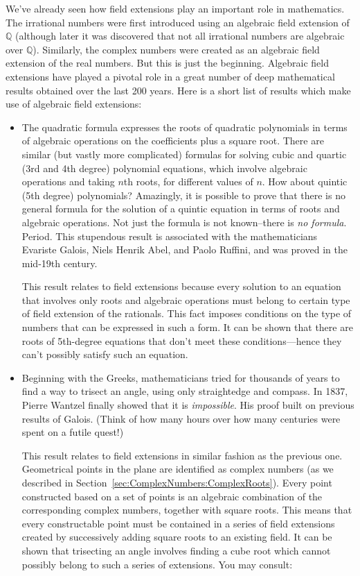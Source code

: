 We've already seen how field extensions play an important role in mathematics.  The irrational numbers were first introduced using an algebraic  field extension  of $\mathbb{Q}$  (although later it was discovered that not all irrational numbers are algebraic over $\mathbb{Q}$).  Similarly, the complex numbers were created as an algebraic field extension of the real numbers.  But this is just the beginning. Algebraic field extensions have played a pivotal role in a great number of deep mathematical results obtained over the last 200 years. Here is a short list of results which make use of algebraic field extensions:

\begin{itemize}
\item 
The quadratic formula expresses the roots of quadratic polynomials  in terms of algebraic operations on the coefficients plus a square root. There are similar (but vastly more complicated) formulas for solving cubic and quartic (3rd and 4th degree)  polynomial equations, which involve algebraic operations and  taking $n$th roots, for different values of $n$.  How about quintic (5th degree) polynomials?  Amazingly, it is possible to prove that there is no general formula for the solution of a quintic equation in terms of roots and algebraic operations.  Not just the formula is not known--there is \emph{no formula}. Period. This stupendous result is associated with the mathematicians Evariste Galois, Niels Henrik Abel, and Paolo Ruffini, and was proved in the mid-19th century.

This result relates to field extensions because every solution to an equation that involves only roots and algebraic operations must belong to certain type of field extension of the rationals. This fact imposes conditions on the type of numbers that can be expressed in such a form. It can be shown that there are roots of 5th-degree equations that don't meet these conditions---hence they can't possibly satisfy such an equation.

\item
Beginning with the Greeks,  mathematicians tried for thousands of years to find a way to trisect an angle, using only straightedge and compass. In 1837, Pierre Wantzel finally showed that it is \emph{impossible}. His proof built on previous results of Galois. (Think of how many hours over how many centuries were spent on a futile quest!)

This result relates to field extensions in similar fashion as the previous one. Geometrical points in the plane are identified as complex numbers (as we described in Section~\ref{sec:ComplexNumbers:ComplexRoots}). Every point constructed based on a set of  points is an algebraic combination of the corresponding complex numbers, together with square roots. This means that every constructable point must be contained in a series of field extensions created by successively adding square roots to an existing field. It can be shown that trisecting an angle involves finding a cube root which cannot possibly belong to such a series of extensions.  You may consult:


\end{itemize}
